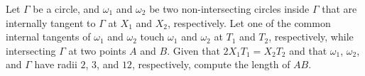 Let $\Gamma$ be a circle, and $\omega_1$ and $\omega_2$ be two non-intersecting circles inside $\Gamma$ that are internally tangent to $\Gamma$ at $X_1$ and $X_2$,  respectively. Let one of the common internal tangents of $\omega_1$ and $\omega_2$ touch $\omega_1$ and $\omega_2$ at $T_1$ and $T_2$,  respectively, while intersecting $\Gamma$ at two points $A$ and $B$. Given that $2X_1T_1=X_2T_2$ and that $\omega_1$,  $\omega_2$,  and $\Gamma$ have radii $2$,  $3$,  and $12$,  respectively, compute the length of $AB$.
